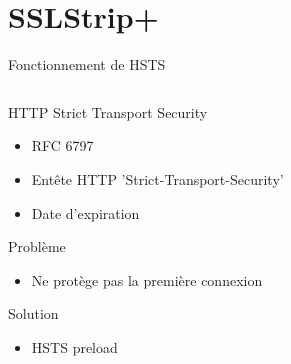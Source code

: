 \section{SSLStrip+}

\begin{frame}{Fonctionnement de HSTS}
  \begin{columns}
    \begin{column}{0.6\textwidth}
      \begin{exampleblock}{HTTP Strict Transport Security}
        \begin{itemize}
        \item RFC 6797
        \item Entête HTTP 'Strict-Transport-Security'
        \item Date d'expiration
        \end{itemize}
      \end{exampleblock}

      \begin{alertblock}{Problème}
        \begin{itemize}
        \item Ne protège pas la première connexion
        \end{itemize}
      \end{alertblock}

      \begin{block}{Solution}
        \begin{itemize}
        \item HSTS preload
        \end{itemize}
      \end{block}


\end{column}
\end{columns}
\end{frame}
